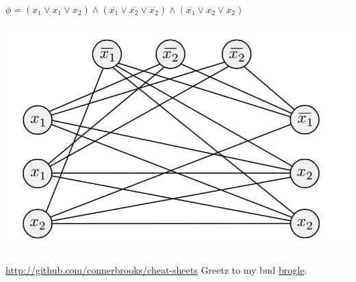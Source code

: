 \documentclass[10pt,landscape]{article}
\begin{document}
\begin{multicols}{3}
$\phi = (x_1 \vee x_1 \vee x_2) \wedge (\overline{x_1} \vee \overline{x_2} \vee \overline{x_2} ) \wedge (\overline{x_1} \vee x_2 \vee x_2)$

\includegraphics[width=0.8\linewidth]{satclique}
 




\href{http://github.com/connerbrooks/cheat-sheets}{http://github.com/connerbrooks/cheat-sheets}
\newline
Greetz to my bud \href{http://github.com/broglea}{brogle}.

\end{multicols}
\end{document}
